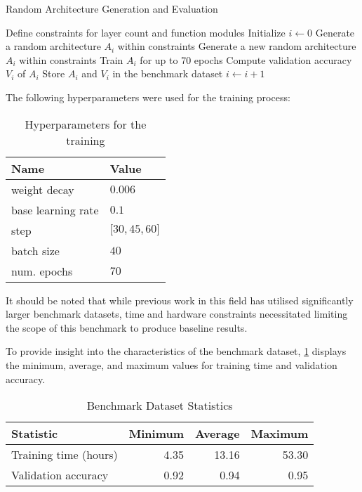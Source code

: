 \begin{algorithm}
\caption{Random Architecture Generation and Evaluation}
\label{alg:random_arch_gen_eval}
\begin{algorithmic}[1]
\State Define constraints for layer count and function modules
\State Initialize $i \gets 0$
    \State Generate a random architecture $A_i$ within constraints
        \State Generate a new random architecture $A_i$ within constraints
    \EndWhile
    \State Train $A_i$ for up to 70 epochs
    \State Compute validation accuracy $V_i$ of $A_i$
    \State Store $A_i$ and $V_i$ in the benchmark dataset
    \State $i \gets i + 1$
\EndWhile
\end{algorithmic}
\end{algorithm}


The following hyperparameters were used for the training process: 

\begin{table}[ht]
\centering
\caption{Hyperparameters for the training}
\begin{tabular}{ll}
\textbf{Name}                           & \textbf{Value}   \\ \hline
\multicolumn{1}{l|}{weight decay}       & $0.006$          \\
\multicolumn{1}{l|}{\cellcolor{verylightgray}base learning rate} & \cellcolor{verylightgray}$0.1$              \\
\multicolumn{1}{l|}{step}               & ${[}30, 45, 60{]}$ \\
\multicolumn{1}{l|}{\cellcolor{verylightgray}batch size}         & \cellcolor{verylightgray}$40$               \\
\multicolumn{1}{l|}{num. epochs}  & {$70$}
\end{tabular}
\end{table}

It should be noted that while previous work in this field has utilised significantly larger benchmark datasets, time and hardware constraints necessitated limiting the scope of this benchmark to produce baseline results.

To provide insight into the characteristics of the benchmark dataset, \cref{tab:benchmark_stats} displays the minimum, average, and maximum values for training time and validation accuracy. 

\begin{table}[ht]
    \centering
    \caption{Benchmark Dataset Statistics}
    \begin{tabular}{lrrr}
        \textbf{Statistic} & \textbf{Minimum} & \textbf{Average} & \textbf{Maximum} \\ \hline
        Training time (hours) & 4.35 & 13.16 & 53.30 \\
        \cellcolor{verylightgray}Validation accuracy & \cellcolor{verylightgray}0.92 & \cellcolor{verylightgray}0.94 & \cellcolor{verylightgray}0.95 \\
    \end{tabular}
    \label{tab:benchmark_stats}
\end{table}


